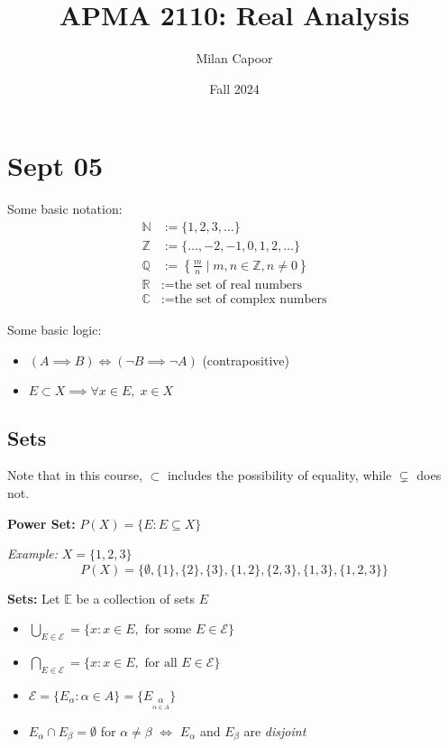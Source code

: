 \documentclass[12pt]{article}
\title{APMA 2110: Real Analysis}
\author{Milan Capoor}
\date{Fall 2024}
\newcommand{\R}{\mathbb{R}}
\newcommand{\E}{\mathbb{E}}
\newcommand{\Z}{\mathbb{Z}}
\newcommand{\N}{\mathbb{N}}
\newcommand{\Q}{\mathbb{Q}}
\newcommand{\C}{\mathbb{C}}
\newcommand{\Ec}{\mathcal{E}}
\newcommand{\sub}{\subseteq}
\begin{document}
\maketitle

\section{Sept 05}
Some basic notation:
\begin{align*}
    \N &:= \{1, 2, 3, \ldots\} \\
    \Z &:= \{\ldots, -2, -1, 0, 1, 2, \ldots\} \\
    \Q &:= \left\{\frac{m}{n} \mid m, n \in \Z, n \neq 0\right\} \\
    \R &:= \text{the set of real numbers}\\
    \C &:= \text{the set of complex numbers}     
\end{align*}

Some basic logic:
\begin{itemize}
    \item $(A \implies B) \iff (\neg B \implies \neg A)$ (contrapositive)
    \item $E \subset X \implies \forall x \in E, \; x \in X$
\end{itemize}

    \subsection*{Sets}
    Note that in this course, $\subset$ includes the possibility of equality, while $\subsetneq$ does not.

    \textbf{Power Set:} $P(X) = \{E: E \sub X\}$

    \emph{Example:} $X = \{1, 2, 3\}$ 
    \[P(X) = \{\emptyset, \{1\}, \{2\}, \{3\}, \{1, 2\}, \{2, 3\}, \{1, 3\}, \{1, 2, 3\}\}\]

    \textbf{Sets:} Let $\E$ be a collection of sets $E$
    \begin{itemize}
        \item $\bigcup_{E \in \Ec} = \{x : x\in E, \text{ for some } E \in \Ec\}$
        \item $\bigcap_{E \in \Ec} = \{x : x\in E, \text{ for all } E \in \Ec\}$
        \item $\Ec = \{E_{\alpha} : \alpha \in A\} = \{E_{\underset{\alpha \in A}{\alpha}}\}$ 
        \item $E_{\alpha} \cap E_{\beta} = \emptyset$ for $\alpha \neq \beta$ $\iff$ $E_{\alpha}$ and $E_{\beta}$ are \emph{disjoint}
    \end{itemize}
\end{document}
